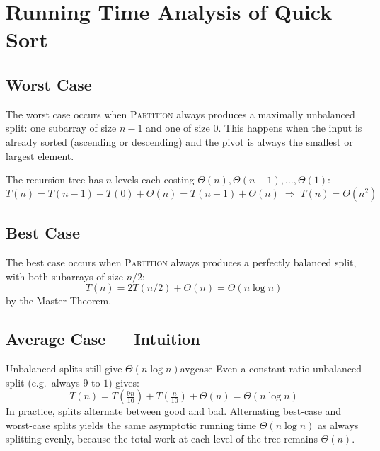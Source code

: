 \section*{Running Time Analysis of Quick Sort}

\subsection{Worst Case}

The worst case occurs when \textsc{Partition} always produces a maximally unbalanced split:
one subarray of size $n-1$ and one of size $0$. This happens when the input is already sorted
(ascending or descending) and the pivot is always the smallest or largest element.

The recursion tree has $n$ levels each costing $\Theta(n), \Theta(n-1), \ldots, \Theta(1)$:
\[
  T(n) = T(n-1) + T(0) + \Theta(n) = T(n-1) + \Theta(n)
  \;\Rightarrow\; T(n) = \Theta(n^2)
\]

\subsection{Best Case}

The best case occurs when \textsc{Partition} always produces a perfectly balanced split,
with both subarrays of size $n/2$:
\[
  T(n) = 2T(n/2) + \Theta(n) = \Theta(n \log n)
\]
by the Master Theorem.

\subsection{Average Case — Intuition}

\begin{remark}{Unbalanced splits still give $\Theta(n \log n)$}{avgcase}
Even a constant-ratio unbalanced split (e.g.\ always $9$-to-$1$) gives:
\[
  T(n) = T\!\left(\tfrac{9n}{10}\right) + T\!\left(\tfrac{n}{10}\right) + \Theta(n) = \Theta(n \log n)
\]
In practice, splits alternate between good and bad. Alternating best-case and worst-case splits
yields the same asymptotic running time $\Theta(n \log n)$ as always splitting evenly, because
the total work at each level of the tree remains $\Theta(n)$.
\end{remark}

